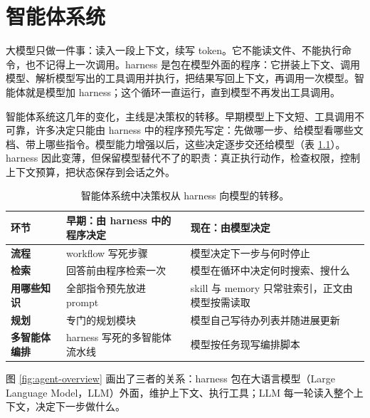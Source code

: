 \chapter{智能体系统}
\label{chap:agents}

\begin{keybox}
大模型只做一件事：读入一段上下文，续写 token。它不能读文件、不能执行命令，也不记得上一次调用。harness 是包在模型外面的程序：它拼装上下文、调用模型、解析模型写出的工具调用并执行，把结果写回上下文，再调用一次模型。智能体就是模型加 harness；这个循环一直运行，直到模型不再发出工具调用。
\end{keybox}

智能体系统这几年的变化，主线是决策权的转移。早期模型上下文短、工具调用不可靠，许多决定只能由 harness 中的程序预先写定：先做哪一步、给模型看哪些文档、带上哪些指令。模型能力增强以后，这些决定逐步交还给模型（表 \ref{tab:agent-decision-shift}）。harness 因此变薄，但保留模型替代不了的职责：真正执行动作，检查权限，控制上下文预算，把状态保存到会话之外。

\begin{table}[H]
\centering\small
\begin{tabularx}{\textwidth}{>{\bfseries}p{24mm} X X}
\toprule
环节 & 早期：由 harness 中的程序决定 & 现在：由模型决定\\
\midrule
流程 & workflow 写死步骤 & 模型决定下一步与何时停止\\
检索 & 回答前由程序检索一次 & 模型在循环中决定何时搜索、搜什么\\
用哪些知识 & 全部指令预先放进 prompt & skill 与 memory 只常驻索引，正文由模型按需读取\\
规划 & 专门的规划模块 & 模型自己写待办列表并随进展更新\\
多智能体编排 & harness 写死的多智能体流水线 & 模型按任务现写编排脚本\\
\bottomrule
\end{tabularx}
\caption{智能体系统中决策权从 harness 向模型的转移。}
\label{tab:agent-decision-shift}
\end{table}

图 \ref{fig:agent-overview} 画出了三者的关系：harness 包在大语言模型（Large Language Model，LLM）外面，维护上下文、执行工具；LLM 每一轮读入整个上下文，决定下一步做什么。

